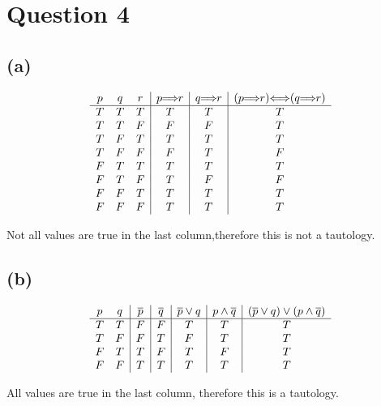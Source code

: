 \documentclass[12pt]{article}
\theoremstyle{definition}
\theoremstyle{definition}
\theoremstyle{definition}
\theoremstyle{definition}
\theoremstyle{definition}
\theoremstyle{example}
\theoremstyle{note}
\theoremstyle{remark}
\let\oldimplies\implies
\let\oldiff\iff
\renewcommand*{\implies}{
	\hspace{-0.05cm}\resizebox{.95\width}{\height}{$\oldimplies$}\hspace{-0.05cm}
}
\renewcommand*{\iff}{
	\hspace{-0.1cm}\oldiff\hspace{-0.1cm}
}
\begin{document}
		\section*{Question 4}
			\subsection*{(a) }		
			\begin{displaymath}
			\begin{array}{c c c|c|c|c}
			p & q & r& p \implies r & q \implies r & (p \implies r) \iff (q \implies r)\\ %
			\hline %
			T & T & T & T & T & T \\
			T & T & F & F & F & T \\
			T & F & T & T & T & T \\
			T & F & F & F & T & F \\
			F & T & T & T & T & T \\
			F & T & F & T & F & F \\
			F & F & T & T & T & T \\
			F & F & F & T & T & T 
			\end{array}
			\end{displaymath}

			Not all values are true in the last column,therefore this is not a tautology.
			\subsection*{(b) }
			\begin{displaymath}
			\begin{array}{c c |c|c|c|c|c}
			p & q & \overline{p} & \overline{q} & \overline{p} \lor q  & p \land \overline{q} & (\overline{p} \lor q) \lor (p \land \overline{q})\\ %
			\hline %
			T & T & F & F & T & T & T\\
			T & F & F & T & F & T & T\\
			F & T & T & F & T & F & T\\
			F & F & T & T & T & T & T\\
			\end{array}
			\end{displaymath}

			All values are true in the last column, therefore this is a tautology.
\end{document}

